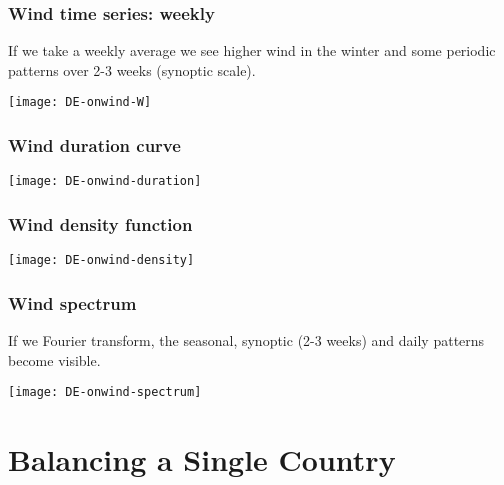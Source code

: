 \documentclass[10pt,aspectratio=169,dvipsnames]{beamer}
\begin{document}
\begin{frame}
  \frametitle{Wind time series: weekly}

  If we take a weekly average we see higher wind in the winter and
  some periodic patterns over 2-3 weeks (\alert{synoptic scale}).

  \centering
  \texttt{[image: DE-onwind-W]}

\end{frame}



\begin{frame}
  \frametitle{Wind duration curve}



  \centering
  \texttt{[image: DE-onwind-duration]}

\end{frame}




\begin{frame}
  \frametitle{Wind density function}

  \centering
  \texttt{[image: DE-onwind-density]}

\end{frame}




\begin{frame}
  \frametitle{Wind spectrum}

  If we Fourier transform, the \alert{seasonal}, \alert{synoptic} (2-3 weeks) and \alert{daily} patterns become visible.

  \centering
  \texttt{[image: DE-onwind-spectrum]}

\end{frame}


\section{Balancing a Single Country}
\end{document}
